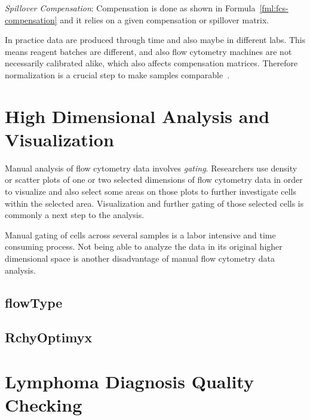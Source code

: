 \emph{Spillover Compensation}: Compensation is done as shown in Formula~\ref{fml:fcs-compensation} and it relies on a given compensation or spillover matrix.

In practice data are produced through time and also maybe in different labs. This means reagent batches are different, and also flow cytometry machines are not necessarily calibrated alike, which also affects compensation matrices. Therefore normalization is a crucial step to make samples comparable~\cite{fcs-normalization}.

\section{High Dimensional Analysis and Visualization}
Manual analysis of flow cytometry data involves \emph{gating}. Researchers use density or scatter plots of one or two selected dimensions  of flow cytometry data in order to visualize and also select some areas on those plots to further investigate cells within the selected area. Visualization and further gating of those selected cells is commonly a next step to the analysis.

Manual gating of cells across several samples is a labor intensive and time consuming process. Not being able to analyze the data in its original higher dimensional space is another disadvantage of manual flow cytometry data analysis.


\subsection{flowType}

\subsection{RchyOptimyx}

\section{Lymphoma Diagnosis Quality Checking}
